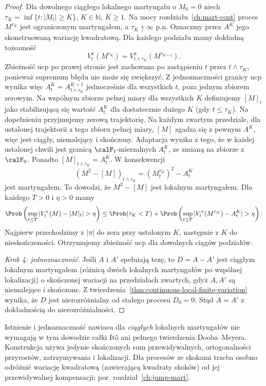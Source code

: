 \begin{proof}
Dla dowolnego ciągłego lokalnego martyngału o $M_0=0$
niech $\tau_K=\inf\{t:|M_t|\ge K\}$, $K\in\mathbb N$,
$K\ge1$. Na mocy rozdziału~\ref{ch:mart-cont}
proces $M^{\tau_K}$ jest ograniczonym martyngałem,
a $\tau_K\uparrow\infty$ p.n. Oznaczmy przez $A^K$
jego skonstruowaną wariację kwadratową.
Dla każdego podziału mamy dokładną tożsamość
\[
V_t^\pi(M^{\tau_K})
=V_{t\wedge\tau_K}^\pi(M^{\tau_{K+1}}).
\]
Zbieżność ucp po prawej stronie jest zachowana
po zastąpieniu $t$ przez $t\wedge\tau_K$, ponieważ
supremum błędu nie może się zwiększyć.
Z jednoznaczności granicy ucp wynika więc
$A^K_t=A^{K+1}_{t\wedge\tau_K}$ jednocześnie
dla wszystkich $t$, poza jednym zbiorem zerowym.
Na wspólnym zbiorze pełnej miary dla wszystkich $K$
definiujemy $[M]_t$ jako stabilizującą się wartość
$A^K_t$ dla dostatecznie dużego $K$ (gdy $t\le\tau_K$).
Na dopełnieniu przyjmujemy zerową trajektorię.
Na każdym zwartym przedziale, dla ustalonej trajektorii
z tego zbioru pełnej miary, $[M]$ zgadza się
z pewnym $A^K$, więc jest ciągły, niemalejący i skończony.
Adaptacja wynika z tego, że w każdej ustalonej chwili
jest granicą $\calF_t$-mierzalnych $A^K_t$,
ze zmianą na zbiorze z $\calF_0$.
Ponadto $[M]_{t\wedge\tau_K}=A^K_t$.
W konsekwencji
\[
(M^2-[M])_{t\wedge\tau_K}
=(M^{\tau_K}_t)^2-A^K_t
\]
jest martyngałem. To dowodzi, że $M^2-[M]$
jest lokalnym martyngałem.
Dla każdego $T>0$ i $\eta>0$ mamy
\[
\Prob\left(\sup_{t\le T}|V_t^\pi(M)-[M]_t|>\eta\right)
\le \Prob(\tau_K<T)+
\Prob\left(\sup_{t\le T}|V_t^\pi(M^{\tau_K})-A^K_t|>\eta\right).
\]
Najpierw przechodzimy z $|\pi|$ do zera przy ustalonym $K$,
następnie z $K$ do nieskończoności.
Otrzymujemy zbieżność ucp dla dowolnych ciągów podziałów.

\emph{Krok 4: jednoznaczność.}
Jeśli $A$ i $A'$ spełniają tezę, to $D=A-A'$ jest
ciągłym lokalnym martyngałem (różnicą dwóch lokalnych
martyngałów po wspólnej lokalizacji)
o skończonej wariacji na przedziałach zwartych,
gdyż $A,A'$ są niemalejące i skończone.
Z twierdzenia~\ref{thm:continuous-local-finite-variation}
wynika, że $D$ jest nierozróżnialny od stałego procesu
$D_0=0$. Stąd $A=A'$ z dokładnością do nierozróżnialności.
\end{proof}

\begin{uwaga}
Istnienie i jednoznaczność nawiasu dla \emph{ciągłych}
lokalnych martyngałów nie wymagają w tym dowodzie
całki Itô ani pełnego twierdzenia Dooba--Meyera.
Konstrukcja używa jedynie skończonych sum przewidywalnych,
ortogonalności przyrostów, zatrzymywania i lokalizacji.
Dla procesów ze skokami trzeba osobno odróżnić
wariację kwadratową (zawierającą kwadraty skoków)
od jej przewidywalnej kompensacji; por. rozdział~\ref{ch:jump-mart}.
\end{uwaga}


